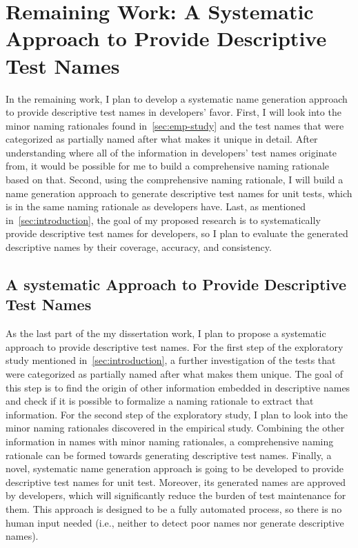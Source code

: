 \section{Remaining Work: A Systematic Approach to Provide Descriptive Test Names}
\label{sec:remaining-work}

In the remaining work, I plan to develop a systematic name generation approach to provide descriptive test names in developers' favor.
%
First, I will look into the minor naming rationales found in~\cref{sec:emp-study} and the test names that were categorized as partially named after what makes it unique in detail.
%
After understanding where all of the information in developers' test names originate from, it would be possible for me to build a comprehensive naming rationale based on that.
%
Second, using the comprehensive naming rationale, I will build a name generation approach to generate descriptive test names for unit tests, which is in the same naming rationale as developers have.
%
Last, as mentioned in~\cref{sec:introduction}, the goal of my proposed research is to systematically provide descriptive test names for developers, so I plan to evaluate the generated descriptive names by their coverage, accuracy, and consistency.


\subsection{A systematic Approach to Provide Descriptive Test Names}

As the last part of the my dissertation work, I plan to propose a systematic approach to provide descriptive test names.
%
For the first step of the exploratory study mentioned in~\cref{sec:introduction}, a further investigation of the tests that were categorized as partially named after what makes them unique.
%
The goal of this step is to find the origin of other information embedded in descriptive names and check if it is possible to formalize a naming rationale to extract that information.
%
For the second step of the exploratory study, I plan to look into the minor naming rationales discovered in the empirical study.
%
Combining the other information in names with minor naming rationales, a comprehensive naming rationale can be formed towards generating descriptive test names.
%
Finally, a novel, systematic name generation approach is going to be developed to provide descriptive test names for unit test.
%
Moreover, its generated names are approved by developers, which will significantly reduce the burden of test maintenance for them.
%
This approach is designed to be a fully automated process, so there is no human input needed (i.e., neither to detect poor names nor generate descriptive names).


